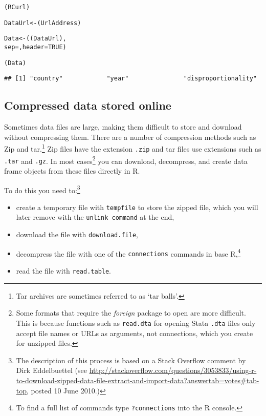 {\small
\begin{knitrout}
\color{fgcolor}\begin{kframe}
\begin{alltt}
(RCurl)

DataUrl <- (UrlAddress)

Data <- ((DataUrl), 
                   sep = , header = TRUE)
					
(Data)
\end{alltt}
\begin{verbatim}
## [1] "country"            "year"               "disproportionality"
\end{verbatim}
\end{kframe}
\end{knitrout}

}

\subsection{Compressed data stored online}

Sometimes data files are large, making them difficult to store and download without compressing them. There are a number of compression methods such as Zip and tar.\footnote{Tar archives are sometimes referred to as `tar balls'.} Zip files have the extension {\tt{.zip}} and tar files use extensions such as {\tt{.tar}} and {\tt{.gz}}. In most cases\footnote{Some formats that require the {\emph{foreign}} package to open are more difficult. This is because functions such as {\tt{read.dta}} for opening Stata {\tt{.dta}} files only accept file names or URLs as arguments, not connections, which you create for unzipped files.} you can download, decompress, and create data frame objects from these files directly in R. 

To do this you need to:\footnote{The description of this process is based on a Stack Overflow comment by Dirk Eddelbuettel (see {\url{http://stackoverflow.com/questions/3053833/using-r-to-download-zipped-data-file-extract-and-import-data?answertab=votes\#tab-top}}, posted 10 June 2010.)}

\begin{itemize}
	\item create a temporary file with {\tt{tempfile}} to store the zipped file, which you will later remove with the {\tt{unlink command}} at the end,
	\item download the file with {\tt{download.file}},
	\item decompress the file with one of the {\tt{connections}} commands in base R,\footnote{To find a full list of commands type {\tt{?connections}} into the R console.}
	\item read the file with {\tt{read.table}}. 
\end{itemize}

